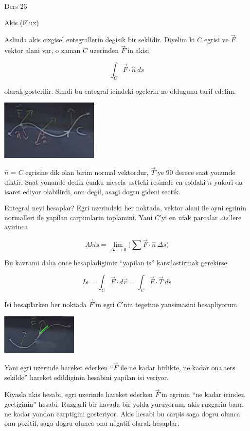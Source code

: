 \documentclass[12pt,fleqn]{article}
\begin{document}
Ders 23

Akis (Flux)

Aslinda akis cizgisel entegrallerin degisik bir seklidir. Diyelim ki $C$
egrisi ve $\vec{F}$ vektor alani var, o zaman $C$ uzerinden $\vec{F}$'in
akisi 

\[ \int_C \vec{F} \cdot \hat{n} \ ds \]

olarak gosterilir. Simdi bu entegral icindeki ogelerin ne oldugunu tarif
edelim. 

\includegraphics[height=3cm]{23_1.png}

$\hat{n}$ = $C$ egrisine dik olan birim normal vektordur, $\vec{T}$'ye 90
derece saat yonunde diktir. Saat yonunde dedik cunku mesela ustteki resimde
en soldaki $\hat{n}$ yukari da isaret ediyor olabilirdi, onu degil, asagi
dogru gideni sectik.

Entegral neyi hesaplar? Egri uzerindeki her noktada, vektor alani ile ayni
egrinin normalleri ile yapilan carpimlarin toplamini. Yani $C$'yi en ufak
parcalar $\Delta s$'lere ayirinca 

\[ Akis = \lim_{\Delta s \to 0} 
\bigg( \sum \vec{F} \cdot \hat{n} \ \Delta s \bigg) \]

Bu kavrami daha once hesapladigimiz ``yapilan is'' karsilastirmak
gerekirse

\[ Is = \int_C \vec{F} \cdot d\vec{r} = \int_C \vec{F} \cdot \vec{T} \ ds \]

Isi hesaplarken her noktada $\vec{F}$'in egri $C$'nin tegetine yansimasini
hesapliyorum. 

\includegraphics[height=2cm]{23_2.png}

Yani egri uzerinde hareket ederken ``$\vec{F}$ ile ne kadar birlikte, ne
kadar ona ters sekilde'' hareket edildiginin hesabini yapilan isi veriyor. 

Kiyasla akis hesabi, egri uzerinde hareket ederken $\vec{F}$'in egrinin
``ne kadar icinden gectiginin'' hesabi. Ruzgarli bir havada bir yolda
yuruyorum, akis ruzgarin bana ne kadar yandan carptigini gosteriyor. Akis
hesabi bu carpis saga dogru olunca onu pozitif, saga dogru olunca onu
negatif olarak hesaplar. 
\end{document}

